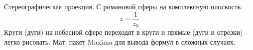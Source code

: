 \begin{frame}
  Стереографическая проекция.  С римановой сферы на комплексную
  плоскость:
  \begin{equation*}
    z = \frac{1}{z_0}
  \end{equation*}
  Круги (дуги) на небесной сфере переходят в круги и прямые (дуги и
  отрезки) -- легко рисовать.  Мат. пакет Maxima для вывода формул в
  сложных случаях.
\end{frame}

